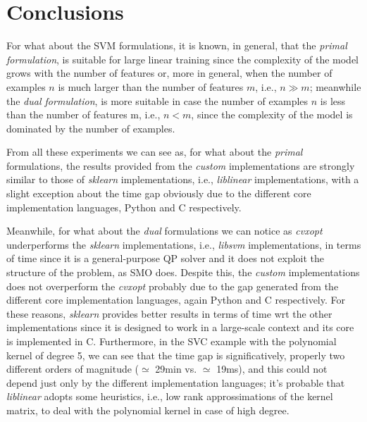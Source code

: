 \section{Conclusions}

For what about the SVM formulations, it is known, in general, that the \emph{primal formulation}, is suitable for large linear training since the complexity of the model grows with the number of features or, more in general, when the number of examples $n$ is much larger than the number of features $m$, i.e., $n \gg m$; meanwhile the \emph{dual formulation}, is more suitable in case the number of examples $n$ is less than the number of features m, i.e., $n < m$, since the complexity of the model is dominated by the number of examples.

\bigskip

From all these experiments we can see as, for what about the \emph{primal} formulations, the results provided from the \emph{custom} implementations are strongly similar to those of \emph{sklearn} implementations, i.e., \emph{liblinear} \cite{fan2008liblinear} implementations, with a slight exception about the time gap obviously due to the different core implementation languages, Python and C respectively.

Meanwhile, for what about the \emph{dual} formulations we can notice as \emph{cvxopt} \cite{vandenberghe2010cvxopt} underperforms the \emph{sklearn} implementations, i.e., \emph{libsvm} \cite{chang2011libsvm} implementations, in terms of time since it is a general-purpose QP solver and it does not exploit the structure of the problem, as SMO does.
Despite this, the \emph{custom} implementations does not overperform the \emph{cvxopt} \cite{vandenberghe2010cvxopt} probably due to the gap generated from the different core implementation languages, again Python and C respectively.
For these reasons, \emph{sklearn} provides better results in terms of time wrt the other implementations since it is designed to work in a large-scale context and its core is implemented in C.
Furthermore, in the SVC example with the polynomial kernel of degree 5, we can see that the time gap is significatively, properly two different orders of magnitude ($\simeq$ 29min vs. $\simeq$ 19ms), and this could not depend just only by the different implementation languages; it's probable that \emph{liblinear} \cite{fan2008liblinear} adopts some heuristics, i.e., low rank approssimations of the kernel matrix, to deal with the polynomial kernel in case of high degree.

